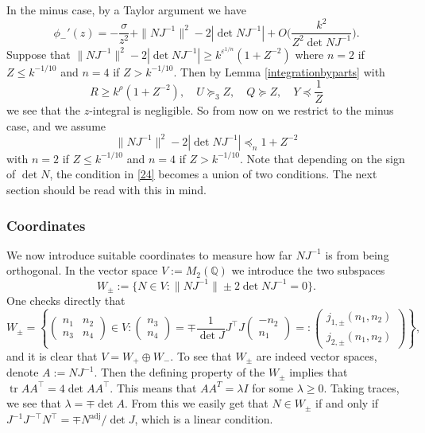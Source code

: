\documentclass[11pt]{amsart}
\numberwithin{equation}{section}
\theoremstyle{plain}
\theoremstyle{definition}
\renewcommand{\geq}{\geqslant}
\renewcommand{\leq}{\le}
\newcommand{\tr}{\operatorname{tr}}
\numberwithin{equation}{section}
\begin{document}
In the minus case, by a Taylor argument we have $$\phi_{-}'(z) = - \frac{\sigma }{z^{2}} + \| N J^{-1} \|^2 -  2 |\det NJ^{-1} |+ O\Big(\frac{k^2}{Z^2 \det NJ^{-1}}\Big).$$ Suppose that  $\| NJ^{-1} \|^2 - 2 |\det NJ^{-1} | \geq k^{\varepsilon^{1/n}} (1+Z^{-2})$ where $n = 2$ if $Z \leq k^{-1/10}$ and $n = 4$ if $Z > k^{-1/10}$.  Then by  Lemma  \ref{integrationbyparts} with $$R\geq k^{\rho} (1+Z^{-2}),  \quad U   \succcurlyeq_{3} Z, \quad Q \succcurlyeq Z, \quad Y \preccurlyeq \frac{1}{Z}$$
we see that the $z$-integral is negligible. So from now on we restrict to the minus case, and we assume 
\begin{equation}\label{24}
\| NJ^{-1} \|^2 - 2 |\det NJ^{-1} | \preccurlyeq_{n} 1+ Z^{-2}
\end{equation}
with  $n = 2$ if $Z \leq k^{-1/10}$ and $n = 4$ if $Z > k^{-1/10}$. 
 Note that depending on the sign of $\det N$, the condition in \eqref{24} becomes a union of two conditions. The next section should be read with this in mind. 

\subsubsection{Coordinates} We now introduce suitable coordinates to measure how far $NJ^{-1}$ is from being orthogonal. In the vector space $V := M_2(\mathbb{Q})$ we introduce the two subspaces
$$W_{\pm} := \{N \in V : \| NJ^{-1} \| \pm 2\det NJ^{-1} = 0\}.$$     
One checks directly that %
\[ W_{\pm} = \left\{ \left(\begin{matrix} n_1 & n_2\\ n_3 & n_4 \end{matrix}\right) \in V :   \left(\begin{matrix} n_3\\ n_4 \end{matrix} \right)  = \mp \frac{1}{\det J} J^{\top}J \left(\begin{matrix} -n_2\\ n_1 \end{matrix} \right) =:\left(\begin{matrix} j_{1, \pm}(n_1, n_2) \\ j_{2, \pm}(n_1, n_2) \end{matrix} \right) \right\},\]
and it is clear that $V = W_+ \oplus W_-$.  To see that $W_{\pm}$ are indeed vector spaces, denote $A:=NJ^{-1}$. Then the defining property of the $W_{\pm}$ implies that $\tr AA^\top = 4 \det A A^\top$. This means that $AA^T = \lambda I$ for some $\lambda \ge 0$. Taking traces, we see that $\lambda = \mp \det A$. From this we easily get that $N \in W_{\pm}$ if and only if $J^{-1} J^{-\top} N^\top = \mp N^{\text{adj}}/\det J$, which is a linear condition. 
\end{document}
